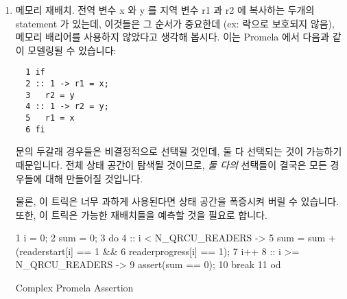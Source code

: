 \begin{enumerate}
\item	메모리 재배치.
	전역 변수 x 와 y 를 지역 변수 r1 과 r2 에 복사하는 두개의 statement 가
	있는데, 이것들은 그 순서가 중요한데 (ex: 락으로 보호되지 않음), 메모리
	배리어를 사용하지 않았다고 생각해 봅시다.
	이는 Promela 에서 다음과 같이 모델링될 수 있습니다:
\iffalse

\item	Memory reordering.  Suppose you have a pair of statements
	copying globals x and y to locals r1 and r2, where ordering
	matters (e.g., unprotected by locks), but where you have
	no memory barriers.  This can be modeled in Promela as follows:
\fi

\vspace{5pt}
\begin{minipage}[t]{\columnwidth}
\scriptsize
\begin{verbatim}
  1 if
  2 :: 1 -> r1 = x;
  3   r2 = y
  4 :: 1 -> r2 = y;
  5   r1 = x
  6 fi
\end{verbatim}
\end{minipage}
\vspace{5pt}

	 문의 두갈래 경우들은 비결정적으로 선택될 것인데, 둘 다 선택되는
	것이 가능하기 때문입니다.
	전체 상태 공간이 탐색될 것이므로, \emph{둘 다의} 선택들이 결국은 모든
	경우들에 대해 만들어질 것입니다.

	물론, 이 트릭은 너무 과하게 사용된다면 상태 공간을 폭증시켜 버릴 수
	있습니다.
	또한, 이 트릭은 가능한 재배치들을 예측할 것을 필요로 합니다.
	\iffalse

	The two branches of the \co{if} statement will be selected
	nondeterministically, since they both are available.
	Because the full state space is searched, \emph{both} choices
	will eventually be made in all cases.

	Of course, this trick will cause your state space to explode
	if used too heavily.
	In addition, it requires you to anticipate possible reorderings.
	\fi

\begin{listing}[tbp]
{ \scriptsize
\begin{verbbox}
  1 i = 0;
  2 sum = 0;
  3 do
  4 :: i < N_QRCU_READERS ->
  5   sum = sum + (readerstart[i] == 1 &&
  6     readerprogress[i] == 1);
  7   i++
  8 :: i >= N_QRCU_READERS ->
  9   assert(sum == 0);
 10   break
 11 od
\end{verbbox}
}
\centering
\theverbbox
\caption{Complex Promela Assertion}
\label{lst:analysis:Complex Promela Assertion}
\end{listing}


\end{enumerate}
